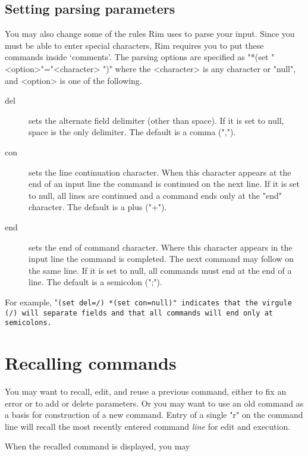 \subsection{Setting parsing parameters}
%
\label{cmt-cmd}
You may also change some of the rules Rim uses to parse your
input.  Since you must be able to enter special characters,
Rim requires you to put these commands inside `comments'.
The parsing options are specified as
\<"*(set " <option>"="<character> ")"\>
where the <character> is any character or "null",
and <option> is one of the following.
\begin{description}
\item[del] sets the alternate field delimiter (other than space).
           If it is set to null, space is the only delimiter.
           The default is a comma (",").
 
\item[con] 
           sets the line continuation character.  When this character
           appears at the end of an input line the command
           is continued on the next line.
           If it is set to null, all lines are continued and
           a command ends only at the "end" character.
           The default is a plus ("+").
\item[end] sets the end of command character.  Where this character
           appears in the input line the command is completed.
           The next command may follow on the same line.
           If it is set to null, all commands must end at the
           end of a line.
           The default is a semicolon (";").
\end{description}
For example,
\<"\tt *(set del=/) *(set con=null)"\>
indicates that the virgule (/) will separate fields and that all
commands will end only at semicolons.
 
 
\section{Recalling commands}
%
You may want to recall, edit, and reuse a previous command,
either to fix an error or to add or delete parameters.
Or you may want to use an old command as a basis for
construction of a new command.  Entry of a single
\<"r"\>
on the command line will recall the most recently entered
command {\em line} for edit and execution.
 
When the recalled command is displayed, you may
 
